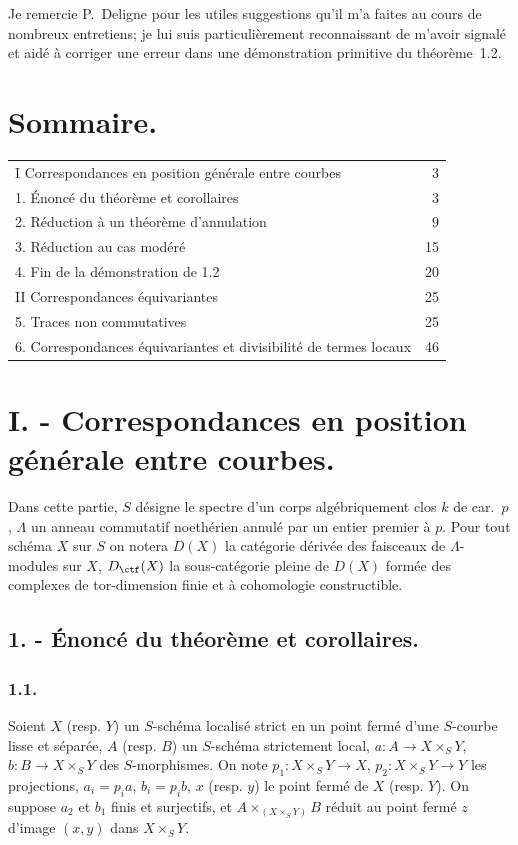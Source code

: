 Je remercie P.~Deligne pour les utiles suggestions qu'il m'a faites au cours de nombreux entretiens; je lui suis particulièrement reconnaissant de m'avoir signalé et aidé à corriger une erreur dans une démonstration primitive du théorème~1.2.

\section*{Sommaire.}
\begin{tabular}{@{}p{}r@{}}
I Correspondances en position générale entre courbes & 3\\
1. Énoncé du théorème et corollaires & 3\\
2. Réduction à un théorème d'annulation & 9\\
3. Réduction au cas modéré & 15\\
4. Fin de la démonstration de 1.2 & 20\\
II Correspondances équivariantes & 25\\
5. Traces non commutatives & 25\\
6. Correspondances équivariantes et divisibilité de termes locaux & 46
\end{tabular}

\section*{I. - Correspondances en position générale entre courbes.}

Dans cette partie, $S$ désigne le spectre d'un corps algébriquement clos $k$ de car.~$p$, $\Lambda$ un anneau commutatif noethérien annulé par un entier premier à $p$. Pour tout schéma $X$ sur $S$ on notera $D(X)$ la catégorie dérivée des faisceaux de $\Lambda$-modules sur $X$, $D_{\ctf}(X)$ la sous-catégorie pleine de $D(X)$ formée des complexes de tor-dimension finie et à cohomologie constructible.

\subsection*{1. - Énoncé du théorème et corollaires.}

\subsubsection*{1.1.}
Soient $X$ (resp. $Y$) un $S$-schéma localisé strict en un point fermé d'une $S$-courbe lisse et séparée, $A$ (resp. $B$) un $S$-schéma strictement local, $a:A\longrightarrow X\times_S Y$, $b:B\longrightarrow X\times_S Y$ des $S$-morphismes. On note $p_1:X\times_S Y\to X$, $p_2:X\times_S Y\to Y$ les projections, $a_i=p_i a$, $b_i=p_i b$, $x$ (resp. $y$) le point fermé de $X$ (resp. $Y$). On suppose $a_2$ et $b_1$ finis et surjectifs, et $A\times_{(X\times_S Y)}B$ réduit au point fermé $z$ d'image $(x,y)$ dans $X\times_S Y$.

